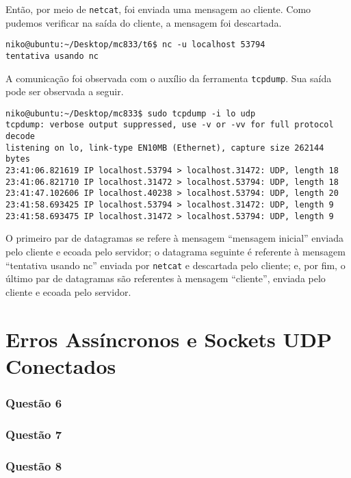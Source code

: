 \documentclass[a4paper,10pt]{article}
\begin{document}
Então, por meio de {\tt netcat}, foi enviada uma mensagem ao cliente. Como pudemos verificar na saída do cliente, a mensagem foi descartada.

\begin{lstlisting}
niko@ubuntu:~/Desktop/mc833/t6$ nc -u localhost 53794
tentativa usando nc

\end{lstlisting}

A comunicação foi observada com o auxílio da ferramenta {\tt tcpdump}. Sua saída pode ser observada a seguir.

\begin{lstlisting}
niko@ubuntu:~/Desktop/mc833$ sudo tcpdump -i lo udp
tcpdump: verbose output suppressed, use -v or -vv for full protocol decode
listening on lo, link-type EN10MB (Ethernet), capture size 262144 bytes
23:41:06.821619 IP localhost.53794 > localhost.31472: UDP, length 18
23:41:06.821710 IP localhost.31472 > localhost.53794: UDP, length 18
23:41:47.102606 IP localhost.40238 > localhost.53794: UDP, length 20
23:41:58.693425 IP localhost.53794 > localhost.31472: UDP, length 9
23:41:58.693475 IP localhost.31472 > localhost.53794: UDP, length 9

\end{lstlisting}

O primeiro par de datagramas se refere à mensagem ``mensagem inicial'' enviada pelo cliente e ecoada pelo servidor; o datagrama seguinte é referente à mensagem ``tentativa usando nc'' enviada por {\tt netcat} e descartada pelo cliente; e, por fim, o último par de datagramas são referentes à mensagem ``cliente'', enviada pelo cliente e ecoada pelo servidor.

\part{Erros Assíncronos e Sockets UDP Conectados}
\section{Questão 6}

\section{Questão 7}

\section{Questão 8}
\end{document}
